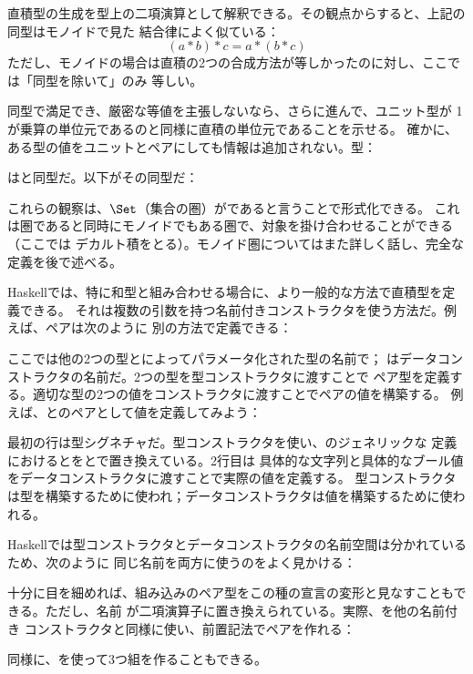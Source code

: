 直積型の生成を型上の二項演算として解釈できる。その観点からすると、上記の同型はモノイドで見た
結合律によく似ている：
\[(a * b) * c = a * (b * c)\]
ただし、モノイドの場合は直積の2つの合成方法が等しかったのに対し、ここでは「同型を除いて」のみ
等しい。

同型で満足でき、厳密な等値を主張しないなら、さらに進んで、ユニット型\code{()}が
1が乗算の単位元であるのと同様に直積の単位元であることを示せる。
確かに、ある型の値をユニットとペアにしても情報は追加されない。型：

はと同型だ。以下がその同型だ：


これらの観察は、$\Set$（集合の圏）がであると言うことで形式化できる。
これは圏であると同時にモノイドでもある圏で、対象を掛け合わせることができる（ここでは
デカルト積をとる）。モノイド圏についてはまた詳しく話し、完全な定義を後で述べる。

Haskellでは、特に和型と組み合わせる場合に、より一般的な方法で直積型を定義できる。
それは複数の引数を持つ名前付きコンストラクタを使う方法だ。例えば、ペアは次のように
別の方法で定義できる：

ここでは他の2つの型とによってパラメータ化された型の名前で；
はデータコンストラクタの名前だ。2つの型を型コンストラクタに渡すことで
ペア型を定義する。適切な型の2つの値をコンストラクタに渡すことでペアの値を構築する。
例えば、とのペアとして値を定義してみよう：

最初の行は型シグネチャだ。型コンストラクタを使い、のジェネリックな
定義におけるとをとで置き換えている。2行目は
具体的な文字列と具体的なブール値をデータコンストラクタに渡すことで実際の値を定義する。
型コンストラクタは型を構築するために使われ；データコンストラクタは値を構築するために使われる。

Haskellでは型コンストラクタとデータコンストラクタの名前空間は分かれているため、次のように
同じ名前を両方に使うのをよく見かける：

十分に目を細めれば、組み込みのペア型をこの種の宣言の変形と見なすこともできる。ただし、名前
が二項演算子\code{(,)}に置き換えられている。実際、\code{(,)}を他の名前付き
コンストラクタと同様に使い、前置記法でペアを作れる：

同様に、\code{(,,)}を使って3つ組を作ることもできる。

